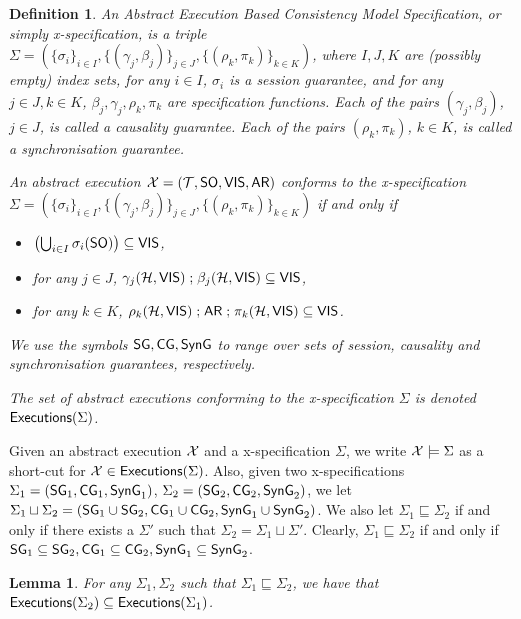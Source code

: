 \documentclass[a4paper,UKenglish]{article}%
\newtheorem{definition}[theorem]{Definition}
\theoremstyle{plain}
\newtheorem{lemma}[thm]{\sc Lemma}
\begin{document}
\begin{definition}
An \emph{Abstract Execution Based Consistency Model Specification}, or simply x-specification, 
is a triple $\Sigma = (\{\sigma_i\}_{i \in I}, \{(\gamma_j, \beta_j)\}_{j \in J}, \{(\rho_k, \pi_k)\}_{k \in K})$, 
where $I, J, K$ are (possibly empty) index sets, for any $i \in I$, $\sigma_i$ is a session guarantee, and 
for any $j \in J, k \in K$, $\beta_j, \gamma_j, \rho_k, \pi_k$ are specification functions. Each 
of the pairs $(\gamma_j, \beta_j)$, $j \in J$, is called a \emph{causality guarantee}. Each of the 
pairs $(\rho_k, \pi_k)$, $k \in K$, is called a \emph{synchronisation guarantee}.

An abstract execution $\mathcal{X} = (\mathcal{T}, {\sf{SO}}, {\mathsf{VIS}}, {\sf{AR}})$ conforms to the x-specification 
$\Sigma = (\{\sigma_i\}_{i \in I}, \{(\gamma_j, \beta_j)\}_{j \in J}, \{(\rho_k, \pi_k)\}_{k \in K})$ 
if and only if 
\begin{itemize}
\item $\left(\bigcup_{i \in I} \sigma_i({\sf{SO}}) \right) \subseteq {\mathsf{VIS}}$, 
\item for any $j \in J$, $\gamma_j(\mathcal{H}, {\mathsf{VIS}}) \mathrel{;} \beta_j(\mathcal{H}, {\mathsf{VIS}}) \subseteq {\mathsf{VIS}}$, 
\item for any $k \in K$, $\rho_k(\mathcal{H}, {\mathsf{VIS}}) \mathrel{;} {\sf{AR}} \mathrel{;} \pi_k(\mathcal{H}, {\mathsf{VIS}}) \subseteq {\mathsf{VIS}}$.
\end{itemize}
We use the symbols $\mathsf{SG}, \mathsf{CG}, \mathsf{SynG}$ to range over sets of session, causality and 
synchronisation guarantees, respectively.

The set of abstract executions conforming to the x-specification $\Sigma$ is denoted 
${\mathsf{Executions}}(\Sigma)$.
\end{definition}
Given an abstract execution $\mathcal{X}$ and a x-specification $\Sigma$, we write 
$\mathcal{X} \models \Sigma$ as a short-cut for 
$\mathcal{X} \in {\mathsf{Executions}}(\Sigma)$. Also, given two x-specifications $\Sigma_1 = (\mathsf{SG}_1, \mathsf{CG}_1, \mathsf{SynG}_1)$, 
$\Sigma_2 = (\mathsf{SG}_2, \mathsf{CG}_2, \mathsf{SynG}_2)$, we let $\Sigma_1 \sqcup \Sigma_2 = (\mathsf{SG}_1 \cup \mathsf{SG}_2, 
\mathsf{CG}_1 \cup \mathsf{CG}_2, \mathsf{SynG}_1 \cup \mathsf{SynG}_2)$. We also let $\Sigma_1 \sqsubseteq \Sigma_2$ if and only if there 
exists a $\Sigma'$ such that $\Sigma_2 = \Sigma_1 \sqcup \Sigma'$. Clearly, $\Sigma_1\sqsubseteq \Sigma_2$ 
if and only if $\mathsf{SG}_1 \subseteq \mathsf{SG}_2, \mathsf{CG}_1 \subseteq \mathsf{CG}_2, \mathsf{SynG}_1 \subseteq \mathsf{SynG}_2$.
\begin{lemma}
\label{lem:xspec.exec}
For any $\Sigma_1, \Sigma_2$ such that $\Sigma_1 \sqsubseteq \Sigma_2$, 
we have that ${\mathsf{Executions}}(\Sigma_2) \subseteq {\mathsf{Executions}}(\Sigma_1)$.
\end{lemma}
\end{document}
